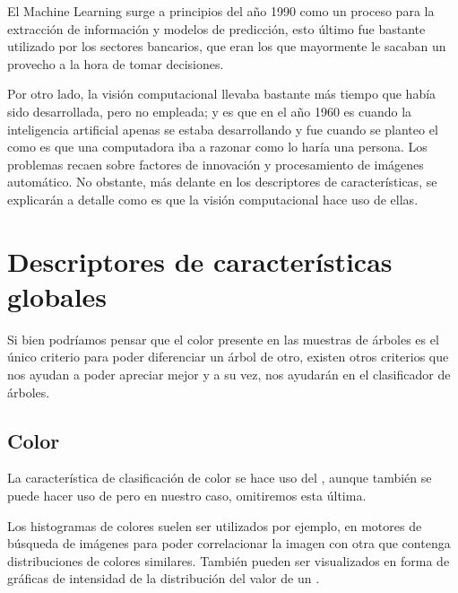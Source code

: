 El Machine Learning \cite{rf5} surge a principios del año 1990 como un proceso para la extracción de información y modelos de predicción, esto último fue bastante utilizado por los sectores bancarios, que eran los que mayormente le sacaban un provecho a la hora de tomar decisiones. 

Por otro lado, la visión computacional \cite{rf6} llevaba bastante más tiempo que había sido desarrollada, pero no empleada; y es que en el año 1960 es cuando la inteligencia artificial apenas se estaba desarrollando y fue cuando se planteo el como es que una computadora iba a razonar como lo haría una persona. Los problemas recaen sobre factores de innovación y procesamiento de imágenes automático. No obstante, más delante en los descriptores de características, se explicarán a detalle como es que la visión computacional hace uso de ellas.


\break

\section{Descriptores de características globales}

Si bien podríamos pensar que el color presente en las muestras de árboles es el único criterio para poder diferenciar un árbol de otro, existen otros criterios que nos ayudan a poder apreciar mejor y a su vez, nos ayudarán en el clasificador de árboles.

\subsection{Color}
La característica de clasificación de color se hace uso del   , aunque también se puede hacer uso de   pero en nuestro caso, omitiremos esta última.

Los histogramas de colores suelen ser utilizados por ejemplo, en motores de búsqueda de imágenes para poder correlacionar la imagen con otra que contenga distribuciones de colores similares. También pueden ser visualizados en forma de gráficas de intensidad de la distribución del valor de un . 

